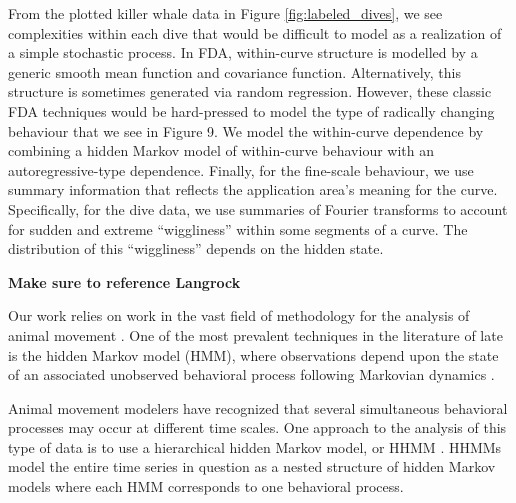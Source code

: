 From the plotted killer whale data in Figure {\ref{fig:labeled_dives}}, we see complexities within each dive that would be difficult to model as a realization of a simple stochastic process. 
In FDA, within-curve structure is modelled by a generic smooth mean function and covariance function.
Alternatively, this structure is sometimes generated via random regression.
However, these classic FDA techniques would be hard-pressed to model the type of radically changing behaviour that we see in Figure 9.
We model the within-curve dependence by combining a hidden Markov model of within-curve behaviour with an autoregressive-type dependence. Finally, for the fine-scale behaviour, we use summary information that reflects the application area's meaning for the curve.  Specifically, for the dive data, we use summaries of Fourier transforms to account for sudden and extreme ``wiggliness'' within some segments of a curve. The distribution of this ``wiggliness'' depends on the hidden state.


{\bf{ Make sure to reference Langrock}}
 

Our work relies on work in the vast field of methodology for the analysis of animal movement
\citep{Hooten:2017,Mcclintock:2020}.
One of the most prevalent techniques in the literature of late is the hidden Markov model (HMM), where observations depend upon the state of an associated unobserved behavioral process following Markovian dynamics \citep{Patterson:2017}. 
%

Animal movement modelers have recognized that several simultaneous behavioral processes may occur at different time scales. 
One approach to the analysis of this type of data is to use a hierarchical hidden Markov model, or HHMM \citep{Barajas:2017,Adam:2019}. 
HHMMs model the entire time series in question as a nested structure of hidden Markov models where each HMM corresponds to one behavioral process.

